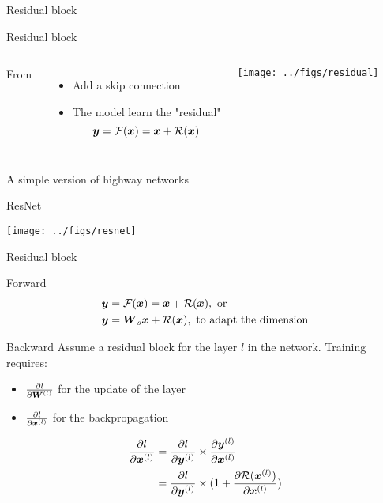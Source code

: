 \begin{frame}{Residual block }
  \begin{block}{Residual block}
    \begin{columns}
    From~\cite{He16Residual}
    \begin{itemize}
    \item Add a skip connection
    \item The model learn the "residual"
      $$
      \boldsymbol{y} = \mathcal{F}(\boldsymbol{x}) = \boldsymbol{x} + \mathcal{R}(\boldsymbol{x})
      $$
    \end{itemize}
      \begin{center}
        \texttt{[image: ../figs/residual]}
      \end{center}
    \end{columns}
    A simple version of highway networks~\cite{Srivastava15Highway}
  \end{block}
  \begin{block}{ResNet}
      \begin{center}
        \texttt{[image: ../figs/resnet]}
      \end{center}    
  \end{block}
\end{frame}


\begin{frame}{Residual block}
  \begin{block}{Forward}
    \begin{align*}
      \boldsymbol{y} &= \mathcal{F}(\boldsymbol{x}) = \boldsymbol{x} + \mathcal{R}(\boldsymbol{x}), \textrm{ or }\\
      \boldsymbol{y} &= \boldsymbol{W}_{s} \boldsymbol{x} + \mathcal{R}(\boldsymbol{x}), \textrm{ to adapt the dimension}
    \end{align*}
  \end{block}
  \begin{block}{Backward}
    Assume a residual block for the layer $l$ in the network. Training requires:
    \begin{itemize}
    \item $\frac{\partial l }{\partial\boldsymbol{W}^{(l)}}$ for the update of the layer
    \item $\frac{\partial l }{\partial\boldsymbol{x}^{(l)}}$ for the backpropagation
    \end{itemize}
    \begin{align*}
      \frac{\partial l }{\partial\boldsymbol{x}^{(l)}} &=       \frac{\partial l }{\partial\boldsymbol{y}^{(l)}} \times  \frac{\partial\boldsymbol{y}^{(l)}}{\partial\boldsymbol{x}^{(l)}}\\
                                            &= \frac{\partial l }{\partial\boldsymbol{y}^{(l)}} \times  (1+\frac{\partial\mathcal{R}(\boldsymbol{x}^{(l)})}{\partial\boldsymbol{x}^{(l)}})
    \end{align*}
  \end{block}
\end{frame}
